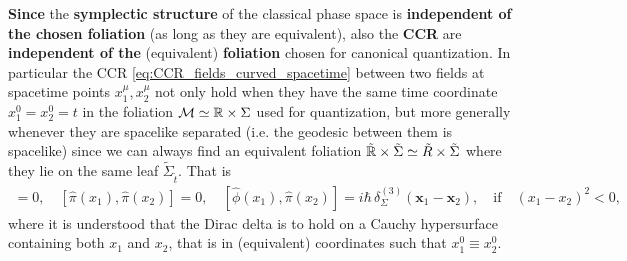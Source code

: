 \documentclass[../QFT_main.tex]{subfiles}
\begin{document}
\begin{mytheorem}
\textbf{Since} the \textbf{symplectic structure} of the classical phase space is \textbf{independent of the chosen foliation} (as long as they are equivalent), also the \textbf{CCR} are \textbf{independent of the} (equivalent) \textbf{foliation} chosen for canonical quantization.
In particular the CCR \eqref{eq:CCR_fields_curved_spacetime} between two fields at spacetime points $x^\mu_1, x^\mu_2$ not only hold when they have the same time coordinate $x^0_1=x^0_2=t$ in the foliation $\mathcal{M}\simeq \mathbb{R}\times \Sigma$ used for quantization, but more generally whenever they are spacelike separated (i.e. the geodesic between them is spacelike) since we can always find an equivalent foliation $\tilde{\mathbb{R}}\times \tilde{\Sigma}\simeq \tilde{R}\times\tilde{\Sigma}$ where they lie on the same leaf $\tilde{\Sigma}_{\tilde{t}}$.
That is
\begin{align}
    [\hat{\phi}(x_1), \hat{\phi}(x_2)] = 0, \quad [\hat{\pi}(x_1), \hat{\pi}(x_2)] = 0, \quad [\hat{\phi}(x_1), \hat{\pi}(x_2)] = i\hbar\, \delta_\Sigma^{(3)}(\mathbf{x}_1 - \mathbf{x}_2),\quad \text{if}\quad (x_1 - x_2)^2 < 0,
\end{align}
where it is understood that the Dirac delta is to hold on a Cauchy hypersurface containing both $x_1$ and $x_2$, that is in (equivalent) coordinates such that $x^0_1 \equiv x^0_2$.


\end{mytheorem}
\end{document}

